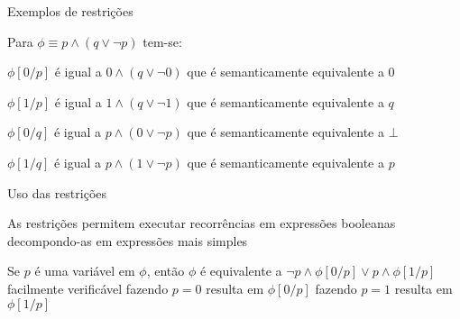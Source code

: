 \expandafter\documentclass\expandafter[table, usenames, svgnames, dvipsnames,14pt, \classopts]{beamer}
\begin{document}
\begin{frame}{Exemplos de restrições}

    Para $\phi \equiv p \land (q \lor \lnot{p})$ tem-se:

    \begin{outline}
        \1 $\phi[0/p]$ é igual a $0 \land (q \lor \lnot{0})$
            \2[-] que é semanticamente equivalente a $0$
            
        \vspace{1em}
        
        \1 $\phi[1/p]$ é igual a $1 \land (q \lor \lnot{1})$
            \2[-] que é semanticamente equivalente a $q$
            
        \vspace{1em}
        
        \1 $\phi[0/q]$ é igual a $p \land (0 \lor \lnot{p})$
            \2[-] que é semanticamente equivalente a $\bot$
            
        \vspace{1em}
        
        \1 $\phi[1/q]$ é igual a $p \land (1 \lor \lnot{p})$
            \2[-] que é semanticamente equivalente a $p$
    \end{outline}
    
\end{frame}

\begin{frame}{Uso das restrições}

    \begin{outline}
        \1 As restrições permitem executar recorrências em expressões booleanas decompondo-as em expressões mais simples
        
        \vspace{1em}
        
        \1 Se $p$ é uma variável em $\phi$, então $\phi$ é equivalente a $\lnot{p} \land \phi[0/p] \lor p \land \phi[1/p]$
            \2[-] facilmente verificável
            \2[-] fazendo $p = 0$ resulta em $\phi[0/p]$
            \2[-] fazendo $p = 1$ resulta em $\phi[1/p]$
    \end{outline}

\end{frame}
\end{document}
